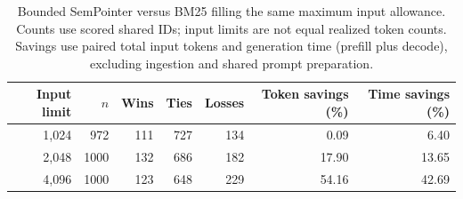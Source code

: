 \begin{table}[htbp]
\centering
\small
\setlength{\tabcolsep}{4pt}
\caption{Bounded SemPointer versus BM25 filling the same maximum input allowance. Counts use scored shared IDs; input limits are not equal realized token counts. Savings use paired total input tokens and generation time (prefill plus decode), excluding ingestion and shared prompt preparation.}
\label{tab:budgets}
\begin{tabular}{rrrrrrr}
\toprule
Input limit & $n$ & Wins & Ties & Losses & Token savings (\%) & Time savings (\%) \\
\midrule
1,024 & 972 & 111 & 727 & 134 & 0.09 & 6.40 \\
2,048 & 1000 & 132 & 686 & 182 & 17.90 & 13.65 \\
4,096 & 1000 & 123 & 648 & 229 & 54.16 & 42.69 \\
\bottomrule
\end{tabular}
\end{table}
